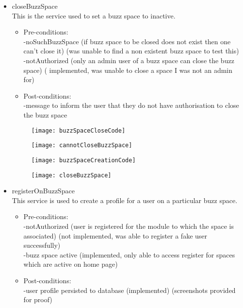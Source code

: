 \begin {itemize}
\begin {itemize}
\item {closeBuzzSpace}\\
This is the service used to set a buzz space to inactive.
\begin {itemize}
\item Pre-conditions: \\
-noSuchBuzzSpace (if buzz space to be closed does not exist then one can't close it) (was unable to find a non existent buzz space to test this)\\
        -notAuthorized (only an admin user of a buzz space can close the buzz space) ( implemented, was unable to close a space I was not an admin for)\\
\item Post-conditions:\\
-message to inform the user that they do not have authorisation to close the buzz space\\
\end{itemize}

\begin{figure}[h!]
  \centering
    \texttt{[image: buzzSpaceCloseCode]} 
\end{figure}

\begin{figure}[h!]
  \centering
    \texttt{[image: cannotCloseBuzzSpace]} 
\end{figure}

\begin{figure}[h!]
  \centering
    \texttt{[image: buzzSpaceCreationCode]} 
\end{figure}

\begin{figure}[h!]
  \centering
    \texttt{[image: closeBuzzSpace]} 
\end{figure}

\item {registerOnBuzzSpace}\\
This service is used to create a profile for a user on a particular buzz space.
\begin {itemize}
\item Pre-conditions: \\
-notAuthorized (user is registered for the module to which the space is associated) (not implemented, was able to register a fake user successfully)\\
        -buzz space active (implemented, only able to access register for spaces which are active on home page)\\
\item Post-conditions: \\
 -user profile persisted to database (implemented) (screenshots provided for proof)\\
\end{itemize}


\end{itemize}
\end{itemize}
